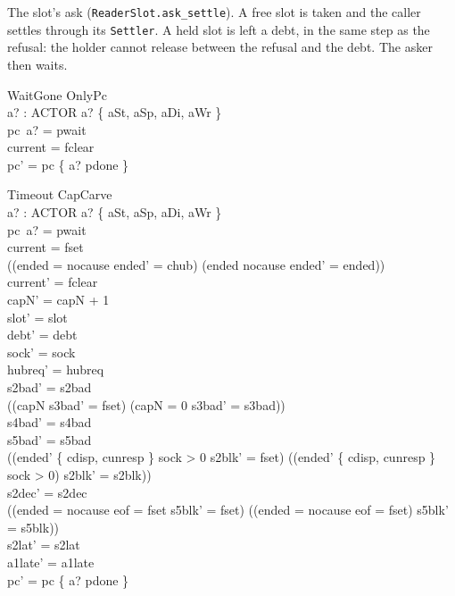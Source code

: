 \documentclass[a4paper,10pt,fleqn]{article}
\begin{document}
The slot's ask (\texttt{ReaderSlot.ask\_settle}).  A free slot is taken and the
caller settles through its \texttt{Settler}.  A held
slot is left a debt, in the same step as the refusal: the holder cannot release
between the refusal and the debt.  The asker then waits.

\begin{schema}{WaitGone}
  OnlyPc \\
  a? : ACTOR
\where
  a? \in \{ aSt, aSp, aDi, aWr \} \\
  pc~a? = pwait \\
  current = fclear \\
  pc' = pc \oplus \{ a? \mapsto pdone \}
\end{schema}

\begin{schema}{Timeout}
  CapCarve \\
  a? : ACTOR
\where
  a? \in \{ aSt, aSp, aDi, aWr \} \\
  pc~a? = pwait \\
  current = fset \\
  ((ended = nocause \land ended' = chub) \lor (ended \neq nocause \land ended' = ended)) \\
  current' = fclear \\
  capN' = capN + 1 \\
  slot' = slot \\
  debt' = debt \\
  sock' = sock \\
  hubreq' = hubreq \\
  s2bad' = s2bad \\
  ((capN  \land s3bad' = fset) \lor (capN = 0 \land s3bad' = s3bad)) \\
  s4bad' = s4bad \\
  s5bad' = s5bad \\
  ((ended' \in \{ cdisp, cunresp \} \land sock > 0 \land s2blk' = fset) \lor
    (\lnot (ended' \in \{ cdisp, cunresp \} \land sock > 0) \land s2blk' = s2blk)) \\
  s2dec' = s2dec \\
  ((ended = nocause \land eof = fset \land s5blk' = fset) \lor
    (\lnot (ended = nocause \land eof = fset) \land s5blk' = s5blk)) \\
  s2lat' = s2lat \\
  a1late' = a1late \\
  pc' = pc \oplus \{ a? \mapsto pdone \}
\end{schema}
\end{document}
